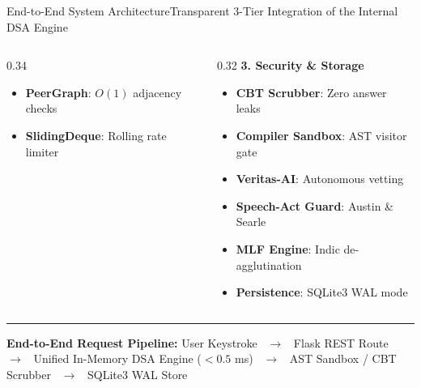 \documentclass[aspectratio=169,10pt]{beamer}
\begin{document}
\begin{frame}[t]{End-to-End System Architecture}{Transparent 3-Tier Integration of the Internal DSA Engine}
\begin{columns}[t]
\begin{column}{0.34\textwidth}
\begin{itemize}
        \item {\fontsize{7.5}{9.2}\selectfont \textbf{PeerGraph}: $O(1)$ adjacency checks}
        \item {\fontsize{7.5}{9.2}\selectfont \textbf{SlidingDeque}: Rolling rate limiter}
      \end{itemize}
    \end{column}
    \begin{column}{0.32\textwidth}
      {\fontsize{8.5}{10.5}\selectfont\textbf{\textcolor{KoinexaRed}{3. Security \& Storage}}}\par\vspace{1.5pt}
      \begin{itemize}\setlength{\itemsep}{1.2pt}
        \item {\fontsize{7.5}{9.2}\selectfont \textbf{CBT Scrubber}: Zero answer leaks}
        \item {\fontsize{7.5}{9.2}\selectfont \textbf{Compiler Sandbox}: AST visitor gate}
        \item {\fontsize{7.5}{9.2}\selectfont \textbf{Veritas-AI}: Autonomous vetting}
        \item {\fontsize{7.5}{9.2}\selectfont \textbf{Speech-Act Guard}: Austin \& Searle}
        \item {\fontsize{7.5}{9.2}\selectfont \textbf{MLF Engine}: Indic de-agglutination}
        \item {\fontsize{7.5}{9.2}\selectfont \textbf{Persistence}: SQLite3 WAL mode}
      \end{itemize}
    \end{column}
  \end{columns}
  \vspace{0.25cm}
  \noindent\rule{\textwidth}{0.4pt}\par\vspace{2pt}
  {\fontsize{7.5}{9.5}\selectfont\textbf{End-to-End Request Pipeline:} User Keystroke \ $\longrightarrow$ \ Flask REST Route \ $\longrightarrow$ \ Unified In-Memory DSA Engine ($< 0.5$ ms) \ $\longrightarrow$ \ AST Sandbox / CBT Scrubber \ $\longrightarrow$ \ SQLite3 WAL Store}
\end{frame}
\end{document}
